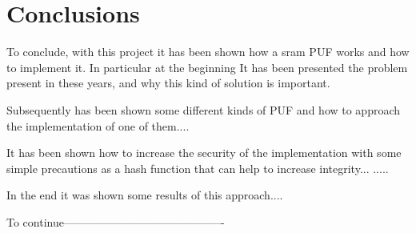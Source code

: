 \chapter{Conclusions}
To conclude, with this project it has been shown how a sram PUF works and how to implement it.
In particular at the beginning It has been presented the problem present in these years, and why this kind of solution is important.


Subsequently has been shown some different kinds of PUF and how to approach the implementation of one of them....


It has been shown how to increase the security of the implementation with some simple precautions as a hash function that can help to increase integrity...
.....


In the end it was shown some results of this approach....

To continue-------------------------------------------
